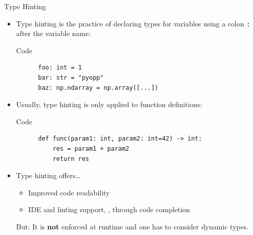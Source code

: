 \begin{frame}[fragile]{
    Type Hinting
    \hfill
  }
  \begin{itemize}
    \setlength{\itemsep}{1.5em}
    \item Type hinting is the practice of declaring types for variables using a colon \texttt{:}
  after the variable name:
  \begin{block}{Code}
    \begin{verbatim}
      foo: int = 1
      bar: str = "pyopp"
      baz: np.ndarray = np.array([...])
    \end{verbatim}
  \end{block}

  \item Usually, type hinting is only applied to function definitions:
  \begin{block}{Code}
    \begin{verbatim}
      def func(param1: int, param2: int=42) -> int:
          res = param1 + param2
          return res
    \end{verbatim}
  \end{block}

  \item Type hinting offers\dots
  \begin{itemize}
    \item Improved code readability
    \item IDE and linting support, \eg{}, through code completion
  \end{itemize}
  But: It is \textbf{not} enforced at runtime and one has to consider dynamic types.
  \end{itemize}
\end{frame}

